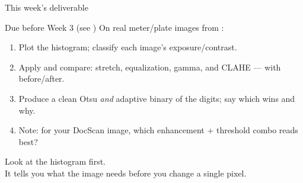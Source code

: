 \documentclass[10pt,aspectratio=169]{beamer}
\begin{document}
\begin{frame}{This week's deliverable}
  \begin{alertblock}{Due before Week 3 (see )}
    On real meter/plate images from :
    \begin{enumerate}
      \item Plot the histogram; classify each image's exposure/contrast.
      \item Apply and compare: stretch, equalization, gamma, and CLAHE — with before/after.
      \item Produce a clean Otsu \emph{and} adaptive binary of the digits; say which wins and why.
      \item Note: for your DocScan image, which enhancement + threshold combo reads best?
    \end{enumerate}
  \end{alertblock}
\end{frame}

\begin{frame}[standout]
  Look at the histogram first.\\[4pt]
  \normalsize It tells you what the image needs before you change a single pixel.
\end{frame}
\end{document}
